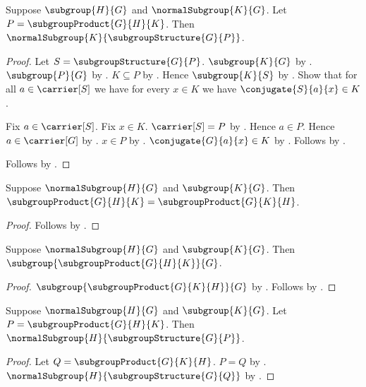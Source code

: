\begin{theorem}\label{subgroup_product_right_factor_normal}
    Suppose $\subgroup{H}{G}$ and $\normalSubgroup{K}{G}$.
    Let $P=\subgroupProduct{G}{H}{K}$.
    Then $\normalSubgroup{K}{\subgroupStructure{G}{P}}$.
\end{theorem}
\begin{proof}
    Let $S=\subgroupStructure{G}{P}$.
    $\subgroup{K}{G}$ by .
    $\subgroup{P}{G}$ by .
    $K\subseteq P$ by .
    Hence $\subgroup{K}{S}$ by
        .
    Show that for all $a\in\carrier[S]$ we have for every $x\in K$
        we have $\conjugate{S}{a}{x}\in K$.
    \begin{subproof}
        Fix $a\in\carrier[S]$.
        Fix $x\in K$.
        $\carrier[S]=P$ by .
        Hence $a\in P$.
        Hence $a\in\carrier[G]$ by
            .
        $x\in P$ by .
        $\conjugate{G}{a}{x}\in K$ by
            .
        Follows by .
    \end{subproof}
    Follows by .
\end{proof}

\begin{theorem}\label{subgroup_product_commutes_if_left_normal}
    Suppose $\normalSubgroup{H}{G}$ and $\subgroup{K}{G}$.
    Then
        $\subgroupProduct{G}{H}{K}=\subgroupProduct{G}{K}{H}$.
\end{theorem}
\begin{proof}
    Follows by
        .
\end{proof}

\begin{theorem}\label{subgroup_product_subgroup_if_left_normal}
    Suppose $\normalSubgroup{H}{G}$ and $\subgroup{K}{G}$.
    Then $\subgroup{\subgroupProduct{G}{H}{K}}{G}$.
\end{theorem}
\begin{proof}
    $\subgroup{\subgroupProduct{G}{K}{H}}{G}$ by
        .
    Follows by .
\end{proof}

\begin{theorem}\label{subgroup_product_left_factor_normal}
    Suppose $\normalSubgroup{H}{G}$ and $\subgroup{K}{G}$.
    Let $P=\subgroupProduct{G}{H}{K}$.
    Then $\normalSubgroup{H}{\subgroupStructure{G}{P}}$.
\end{theorem}
\begin{proof}
    Let $Q=\subgroupProduct{G}{K}{H}$.
    $P=Q$ by .
    $\normalSubgroup{H}{\subgroupStructure{G}{Q}}$ by
        .
\end{proof}

